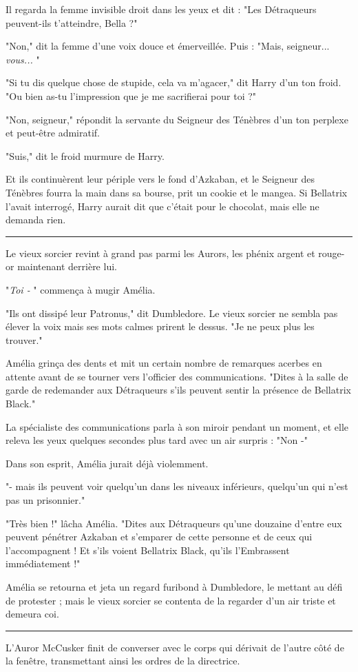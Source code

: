 Il regarda la femme invisible droit dans les yeux et dit : "Les Détraqueurs peuvent-ils t'atteindre, Bella ?"

"Non," dit la femme d'une voix douce et émerveillée. Puis : "Mais, seigneur... \emph{vous...} "

"Si tu dis quelque chose de stupide, cela va m'agacer," dit Harry d'un ton froid. "Ou bien as-tu l'impression que je me sacrifierai pour toi ?"

"Non, seigneur," répondit la servante du Seigneur des Ténèbres d'un ton perplexe et peut-être admiratif.

"Suis," dit le froid murmure de Harry.

Et ils continuèrent leur périple vers le fond d'Azkaban, et le Seigneur des Ténèbres fourra la main dans sa bourse, prit un cookie et le mangea. Si Bellatrix l'avait interrogé, Harry aurait dit que c'était pour le chocolat, mais elle ne demanda rien.
\par\noindent\rule{\textwidth}{0.4pt}
Le vieux sorcier revint à grand pas parmi les Aurors, les phénix argent et rouge-or maintenant derrière lui.

"\emph{Toi -} " commença à mugir Amélia.

"Ils ont dissipé leur Patronus," dit Dumbledore. Le vieux sorcier ne sembla pas élever la voix mais ses mots calmes prirent le dessus. "Je ne peux plus les trouver."

Amélia grinça des dents et mit un certain nombre de remarques acerbes en attente avant de se tourner vers l'officier des communications. "Dites à la salle de garde de redemander aux Détraqueurs s'ils peuvent sentir la présence de Bellatrix Black."

La spécialiste des communications parla à son miroir pendant un moment, et elle releva les yeux quelques secondes plus tard avec un air surpris : "Non -"

Dans son esprit, Amélia jurait déjà violemment.

"- mais ils peuvent voir quelqu'un dans les niveaux inférieurs, quelqu'un qui n'est pas un prisonnier."

"Très bien !" lâcha Amélia. "Dites aux Détraqueurs qu'une douzaine d'entre eux peuvent pénétrer Azkaban et s'emparer de cette personne et de ceux qui l'accompagnent ! Et s'ils voient Bellatrix Black, qu'ils l'Embrassent immédiatement !"

Amélia se retourna et jeta un regard furibond à Dumbledore, le mettant au défi de protester ; mais le vieux sorcier se contenta de la regarder d'un air triste et demeura coi.
\par\noindent\rule{\textwidth}{0.4pt}
L'Auror McCusker finit de converser avec le corps qui dérivait de l'autre côté de la fenêtre, transmettant ainsi les ordres de la directrice.

